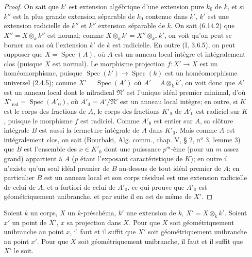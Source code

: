 \begin{proof}
On sait que $k'$ est extension algébrique d'une extension pure $k_0$ de
$k$, et si $k''$ est la plus grande extension séparable de $k_0$ contenue
dans $k'$, $k'$ est une extension radicielle de $k''$ et $k''$ extension
séparable de $k$. On sait (6.14.2) que $X''=X\otimes_k k''$ est normal;
comme $X\otimes_k k'=X''\otimes_{k''}k'$, on voit qu'on peut se borner au
cas où l'extension $k'$ de $k$ est radicielle. En outre (I, 3.6.5), on peut
supposer que $X=\operatorname{Spec}(A)$, où $A$ est un anneau local intègre
et intégralement clos (puisque $X$ est normal). Le morphisme projection
$f:X'\to X$ est un homéomorphisme, puisque
$\operatorname{Spec}(k')\to\operatorname{Spec}(k)$ est un homéomorphisme
universel (2.4.5); comme $X'=\operatorname{Spec}(A')$ où
$A'=A\otimes_k k'$, on voit donc que $A'$ est un anneau local dont le
nilradical $\mathfrak N'$ est l'unique idéal premier minimal, d'où
$X'_{\mathrm{red}}=\operatorname{Spec}(A'_0)$, où
$A'_0=A'/\mathfrak N'$ est un anneau local intègre; en outre, si $K$ est
le corps des fractions de $A$, le corps des fractions $K'_0$ de $A'_0$ est
radiciel sur $K$, puisque le morphisme $f$ est radiciel. Comme $A'_0$ est
entier sur $A$, sa clôture intégrale $B$ est aussi la fermeture intégrale
de $A$ dans $K'_0$. Mais comme $A$ est intégralement clos, on sait
(Bourbaki, Alg. comm., chap. V, § 2, n$^o$ 3, lemme 3) que $B$ est
l'ensemble des $x\in K'_0$ dont une puissance $p^m$-ème (pour un $m$ assez
grand) appartient à $A$ ($p$ étant l'exposant caractéristique de $K$);
en outre il n'existe qu'un seul idéal premier de $B$ au-dessus de tout idéal
premier de $A$; en particulier $B$ est un anneau local et son corps résiduel
est une extension radicielle de celui de $A$, et a fortiori de celui de
$A'_0$, ce qui prouve que $A'_0$ est géométriquement unibranche, et par
suite il en est de même de $X'$.
\end{proof}

\begin{proposition}[6.15.7]
\label{IV.2.s6.15.7-fr}
Soient $k$ un corps, $X$ un $k$-préschéma, $k'$ une extension de $k$,
$X'=X\otimes_k k'$. Soient $x'$ un point de $X'$, $x$ sa projection dans
$X$. Pour que $X$ soit géométriquement unibranche au point $x$, il faut et
il suffit que $X'$ soit géométriquement unibranche au point $x'$. Pour que
$X$ soit géométriquement unibranche, il faut et il suffit que $X'$ le soit.
\end{proposition}

